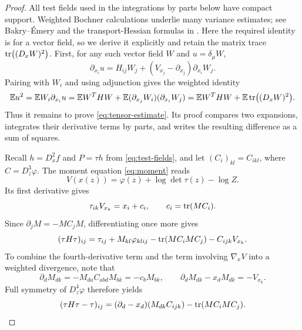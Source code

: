 \begin{proof}
All test fields used in the integrations by parts below have compact support. Weighted Bochner calculations underlie many variance estimates; see Bakry--\'Emery \cite[Proposition~3]{BakryEmery1985} and the transport-Hessian formulas in \cite[Section~4.3]{KLR2026}. Here the required identity is for a vector field, so we derive it explicitly and retain the matrix trace $\tr((D_xW)^2)$. First, for any such vector field $W$ and $u=\delta_\mu W$,
\[
 \partial_{x_i}u
 =H_{ij}W_j+(V_{x_j}-\partial_{x_j})\partial_{x_i}W_j.
\]
Pairing with $W_i$ and using adjunction gives the weighted identity
\begin{equation}\label{eq:bochner}
 \mathbb{E}u^2
 =\mathbb{E}W_i\partial_{x_i}u
 =\mathbb{E}W^THW
   +\mathbb{E}(\partial_{x_j}W_i)(\partial_{x_i}W_j)
 =\mathbb{E}W^THW+\mathbb{E}\tr\bigl((D_xW)^2\bigr).
\end{equation}
Thus it remains to prove \eqref{eq:tensor-estimate}. Its proof compares two expansions, integrates their derivative terms by parts, and writes the resulting difference as a sum of squares.

Recall $h=D_x^2f$ and $P=\tau h$ from \eqref{eq:test-fields}, and let $(C_i)_{kl}=C_{ikl}$, where $C=D_z^3\varphi$. The moment equation \eqref{eq:moment} reads
\[
 V(x(z))=\varphi(z)+\log\det\tau(z)-\log Z.
\]
Its first derivative gives
\[
 \tau_{ik}V_{x_k}=x_i+c_i,
 \qquad c_i=\tr(MC_i).
\]
Since $\partial_jM=-MC_jM$, differentiating once more gives
\[
 (\tau H\tau)_{ij}
 =\tau_{ij}+M_{kl}\varphi_{klij}
   -\tr(MC_iMC_j)-C_{ijk}V_{x_k}.
\]
To combine the fourth-derivative term and the term involving $\nabla_xV$ into a weighted divergence, note that
\[
 \partial_dM_{dk}
 =-M_{da}C_{abd}M_{bk}=-c_bM_{bk},
 \qquad
 \partial_dM_{dk}-x_dM_{dk}=-V_{x_k}.
\]
Full symmetry of $D_z^4\varphi$ therefore yields
\begin{equation}\label{eq:twice-moment}
 (\tau H\tau-\tau)_{ij}
 =(\partial_d-x_d)(M_{dk}C_{ijk})
   -\tr(MC_iMC_j).
\end{equation}


\end{proof}

